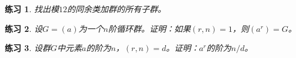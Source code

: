 \documentclass{article}
\newtheorem{Exercise}{练习}
\begin{document}
\begin{CJK*}{UTF8}{gbsn}
\begin{Exercise}
找出模$12$的同余类加群的所有子群。
\end{Exercise}

\begin{Exercise}
  设$G=(a)$为一个$n$阶循环群。证明：如果$(r,n)=1$，则$(a^r)=G$。
\end{Exercise}


\begin{Exercise}
  设群$G$中元素$a$的阶为$n$，$(r,n)=d$。证明：$a^r$的阶为$n/d$。
\end{Exercise}
\end{CJK*}
\end{document}
